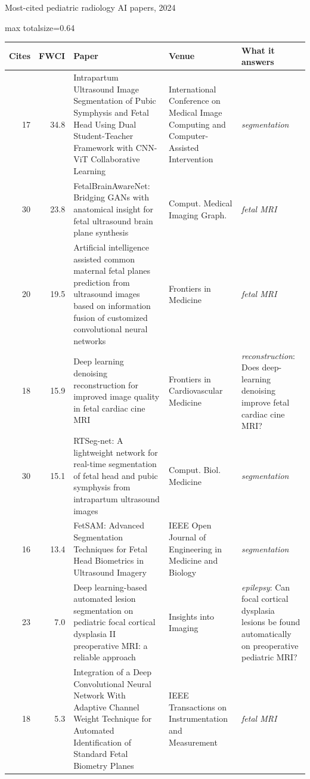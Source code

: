 \documentclass[aspectratio=169]{beamer}
\renewcommand{\arraystretch}{1.08}
\begin{document}
\begin{frame}[category=Journals/Preprints]{Most-cited pediatric radiology AI papers, 2024}
\tiny
\begin{adjustbox}{max totalsize={\textwidth}{0.64\textheight}}
\renewcommand{\arraystretch}{1.2}
\begin{tabular}{|r|r|>{\raggedright\arraybackslash}p{}|>{\raggedright\arraybackslash}p{}|>{\raggedright\arraybackslash}p{}|}
\hline \textbf{Cites} & \textbf{FWCI} & \textbf{Paper} & \textbf{Venue} & \textbf{What it answers} \\ \hline
17 & 34.8 & Intrapartum Ultrasound Image Segmentation of Pubic Symphysis and Fetal Head Using Dual Student-Teacher Framework with CNN-ViT Collaborative Learning & International Conference on Medical Image Computing and Computer-Assisted Intervention & \textit{segmentation} \\ \hline
30 & 23.8 & FetalBrainAwareNet: Bridging GANs with anatomical insight for fetal ultrasound brain plane synthesis & Comput. Medical Imaging Graph. & \textit{fetal MRI} \\ \hline
20 & 19.5 & Artificial intelligence assisted common maternal fetal planes prediction from ultrasound images based on information fusion of customized convolutional neural networks & Frontiers in Medicine & \textit{fetal MRI} \\ \hline
18 & 15.9 & Deep learning denoising reconstruction for improved image quality in fetal cardiac cine MRI & Frontiers in Cardiovascular Medicine & \textit{reconstruction}: Does deep-learning denoising improve fetal cardiac cine MRI? \\ \hline
30 & 15.1 & RTSeg-net: A lightweight network for real-time segmentation of fetal head and pubic symphysis from intrapartum ultrasound images & Comput. Biol. Medicine & \textit{segmentation} \\ \hline
16 & 13.4 & FetSAM: Advanced Segmentation Techniques for Fetal Head Biometrics in Ultrasound Imagery & IEEE Open Journal of Engineering in Medicine and Biology & \textit{segmentation} \\ \hline
23 & 7.0 & Deep learning-based automated lesion segmentation on pediatric focal cortical dysplasia II preoperative MRI: a reliable approach & Insights into Imaging & \textit{epilepsy}: Can focal cortical dysplasia lesions be found automatically on preoperative pediatric MRI? \\ \hline
18 & 5.3 & Integration of a Deep Convolutional Neural Network With Adaptive Channel Weight Technique for Automated Identification of Standard Fetal Biometry Planes & IEEE Transactions on Instrumentation and Measurement & \textit{fetal MRI} \\ \hline

\end{tabular}
\end{adjustbox}
\end{frame}
\end{document}
